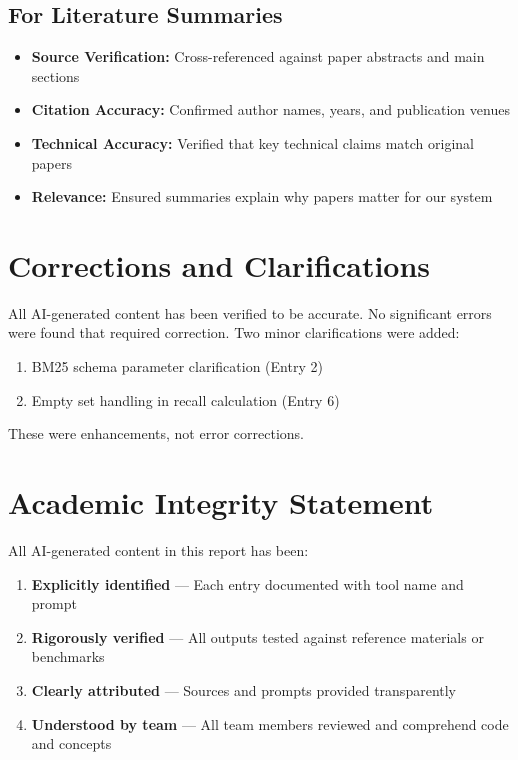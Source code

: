 \documentclass[12pt,a4paper]{report}
\begin{document}
\subsection{For Literature Summaries}
\begin{itemize}
    \item \textbf{Source Verification:} Cross-referenced against paper abstracts and main sections
    \item \textbf{Citation Accuracy:} Confirmed author names, years, and publication venues
    \item \textbf{Technical Accuracy:} Verified that key technical claims match original papers
    \item \textbf{Relevance:} Ensured summaries explain why papers matter for our system
\end{itemize}

\section{Corrections and Clarifications}

All AI-generated content has been verified to be accurate. No significant errors were found that required correction. Two minor clarifications were added:

\begin{enumerate}
    \item BM25 schema parameter clarification (Entry 2)
    \item Empty set handling in recall calculation (Entry 6)
\end{enumerate}

These were enhancements, not error corrections.

\section{Academic Integrity Statement}

All AI-generated content in this report has been:
\begin{enumerate}
    \item \textbf{Explicitly identified} --- Each entry documented with tool name and prompt
    \item \textbf{Rigorously verified} --- All outputs tested against reference materials or benchmarks
    \item \textbf{Clearly attributed} --- Sources and prompts provided transparently
    \item \textbf{Understood by team} --- All team members reviewed and comprehend code and concepts
\end{enumerate}
\end{document}
